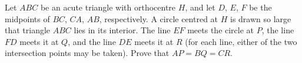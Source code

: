 Let $ABC$ be an acute triangle with orthocentre $H$, and let $D$, $E$, $F$ be the midpoints of $BC$, $CA$, $AB$, respectively. A circle centred at $H$ is drawn so large that triangle $ABC$ lies in its interior. The line $EF$ meets the circle at $P$, the line $FD$ meets it at $Q$, and the line $DE$ meets it at $R$ (for each line, either of the two intersection points may be taken). Prove that $AP=BQ=CR$.
